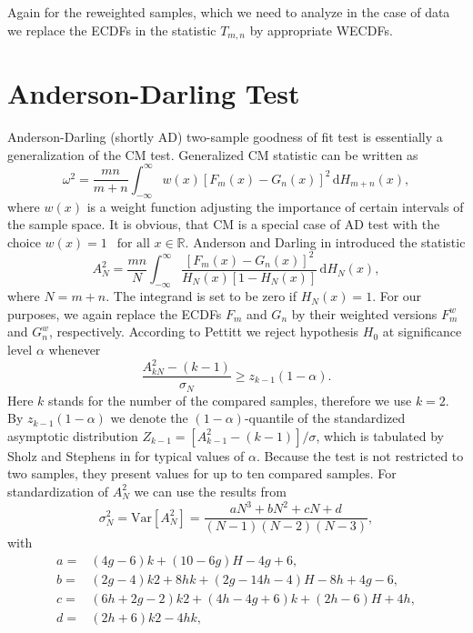 Again for the reweighted samples, which we need to analyze in the case of \dzero data we replace the ECDFs in the statistic $T_{m,n}$ by appropriate WECDFs.

\section{Anderson-Darling Test}
Anderson-Darling (shortly AD)  two-sample goodness of fit test is essentially a generalization of the CM test. Generalized CM statistic can be written as 
\begin{equation}
\omega^2 = \frac{mn}{m+n} \int_{-\infty}^\infty w(x) \left[F_m(x) - G_n(x) \right]^2 \,\mathrm{d} H_{m+n}(x),
\end{equation}
where $w(x)$ is a weight function adjusting the importance of certain intervals of the sample space. It is obvious, that CM is a special case of AD test with the choice $w(x) = 1 \:\: \text{ for all } x \in \mathbb{R}.$ Anderson and Darling   in \cite{AndersonDarling1954} introduced the statistic 
\begin{equation}
A^2_{N} = \frac{mn}{N} \int_{-\infty}^\infty \frac{\left[F_m(x) - G_n(x) \right]^2}{H_{N}(x)\left[ 1 - H_{N}(x)\right]} \,\mathrm{d} H_{N}(x),
\label{eq:ADstat}
\end{equation}
where $N = m+n$. The integrand is set to be zero if $H_{N}(x) = 1$. For our purposes, we again replace the ECDFs $F_m$ and $G_n$ by their weighted versions $F_m^w$ and $G_n^w$, respectively.
According to Pettitt \cite{Pettitt1976} we reject hypothesis $H_0$ at significance level $\alpha$ whenever
\begin{equation}
\frac{A^2_{kN} - (k-1)}{\sigma_{N}} \geq z_{k-1}(1-\alpha).
\end{equation}
Here $k$ stands for the number of the compared samples, therefore we use $k=2$. By $z_{k-1}(1-\alpha)$ we denote the $(1-\alpha)$-quantile of the standardized asymptotic distribution $Z_{k-1} = [A^2_{k-1} - (k-1)]/{\sigma}$, which is tabulated by Sholz and Stephens in \cite{Sholz1986} for typical values of $\alpha$.  Because the test is not restricted to two samples, they present values for up to ten compared samples.
For standardization of $A^2_{N}$ we can use the results from \cite{Sholz1986} 
\begin{equation}
\sigma_{N}^2 = \mathrm{Var}\left[ A^2_{N}\right] = \frac{ aN^3 + bN^2 + cN + d
 }{(N-1)(N-2)(N-3)},
\end{equation}
with 
\begin{align*}
a = & (4g - 6)k + (10 - 6g)H - 4g + 6, \\
b = &(2g - 4)k 2 + 8hk + (2g - 14h - 4)H - 8h + 4g - 6, \\
c = &(6h + 2g - 2)k2 + (4h - 4g + 6)k + (2h - 6)H + 4h,  \\
d = &(2h + 6)k 2 - 4hk, 
\end{align*}
